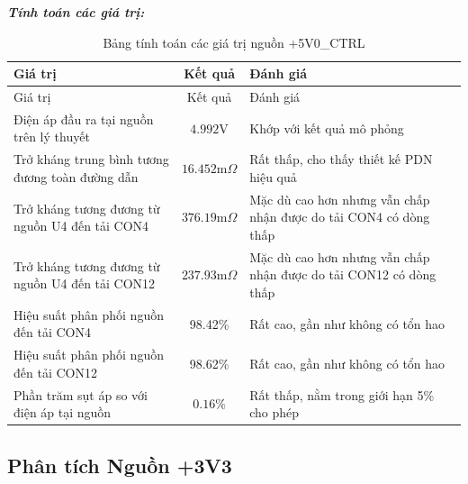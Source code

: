             \textbf{\textit{Tính toán các giá trị:}}
            \begin{longtable}{|p{}|c|p{}|}           
                \caption{Bảng tính toán các giá trị nguồn +5V0\_CTRL}\\
                \hline
                Giá trị & Kết quả & Đánh giá \\
                \hline
                \endfirsthead
                
                \hline
                Giá trị & Kết quả & Đánh giá \\
                \hline
                \endhead
                
                \hline
                \endfoot
                
                \hline
                \endlastfoot
                
                Điện áp đầu ra tại nguồn trên lý thuyết & $4.992\text{V}$ & Khớp với kết quả mô phỏng \\
                Trở kháng trung bình tương đương toàn đường dẫn & $16.452\text{m}\Omega$ & Rất thấp, cho thấy thiết kế PDN hiệu quả \\
                Trở kháng tương đương từ nguồn U4 đến tải CON4 & $376.19\text{m}\Omega$ & Mặc dù cao hơn nhưng vẫn chấp nhận được do tải CON4 có dòng thấp \\
                Trở kháng tương đương từ nguồn U4 đến tải CON12 & $237.93\text{m}\Omega$ & Mặc dù cao hơn nhưng vẫn chấp nhận được do tải CON12 có dòng thấp \\
                Hiệu suất phân phối nguồn đến tải CON4 & 98.42\% & Rất cao, gần như không có tổn hao \\
                Hiệu suất phân phối nguồn đến tải CON12 & 98.62\% & Rất cao, gần như không có tổn hao \\
                Phần trăm sụt áp so với điện áp tại nguồn & $\mathbf{0.16\%}$ & Rất thấp, nằm trong giới hạn 5\% cho phép
                \label{tab:5v0_ctrl_current_density_calculation}\\

                \hline
            \end{longtable}
            
        \subsection{Phân tích Nguồn +3V3}
                
